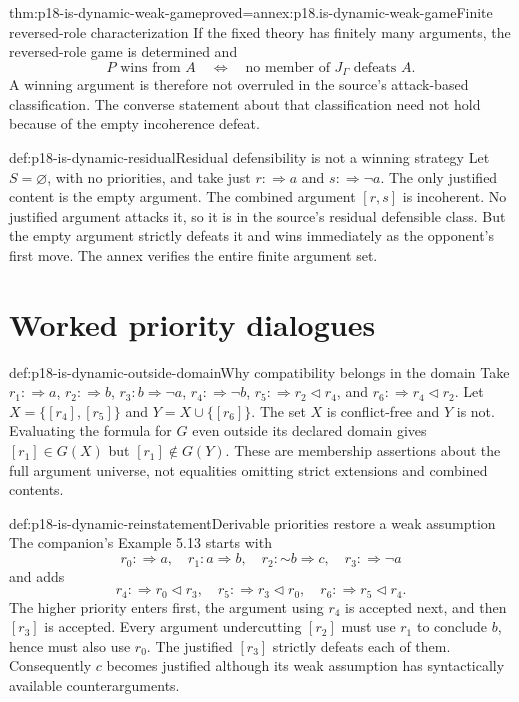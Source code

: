 \begin{hbtheorem}{thm:p18-is-dynamic-weak-game}{proved=annex:p18.is-dynamic-weak-game}{Finite reversed-role characterization}
If the fixed theory has finitely many arguments, the reversed-role
game is determined and
\[
 P\text{ wins from }A
 \quad\Longleftrightarrow\quad
 \text{no member of }J_\Gamma\text{ defeats }A.
\]
A winning argument is therefore not overruled in the source's
attack-based classification. The converse statement about that
classification need not hold because of the empty incoherence
defeat.
\end{hbtheorem}

\begin{hbexample}{def:p18-is-dynamic-residual}{Residual defensibility is not a winning strategy}
Let \(S=\varnothing\), with no priorities, and take just
\(r:\Rightarrow a\) and \(s:\Rightarrow\neg a\).
The only justified content is the empty argument.
The combined argument \([r,s]\) is incoherent. No justified argument
attacks it, so it is in the source's residual defensible class.
But the empty argument strictly defeats it and wins immediately
as the opponent's first move. The annex verifies the entire finite
argument set.
\end{hbexample}

\section{Worked priority dialogues}

\begin{hbexample}{def:p18-is-dynamic-outside-domain}{Why compatibility belongs in the domain}
Take \(r_1:\Rightarrow a\), \(r_2:\Rightarrow b\),
\(r_3:b\Rightarrow\neg a\), \(r_4:\Rightarrow\neg b\),
\(r_5:\Rightarrow r_2\triangleleft r_4\), and
\(r_6:\Rightarrow r_4\triangleleft r_2\).
Let \(X=\{[r_4],[r_5]\}\) and \(Y=X\cup\{[r_6]\}\).
The set \(X\) is conflict-free and \(Y\) is not.
Evaluating the formula for \(G\) even outside its declared domain
gives \([r_1]\in G(X)\) but \([r_1]\notin G(Y)\).
These are membership assertions about the full argument universe,
not equalities omitting strict extensions and combined contents.
\end{hbexample}

\begin{hbexample}{def:p18-is-dynamic-reinstatement}{Derivable priorities restore a weak assumption}
The companion's Example 5.13 starts with
\[
r_0:\Rightarrow a,\quad r_1:a\Rightarrow b,\quad
r_2:\mathord{\sim}b\Rightarrow c,\quad r_3:\Rightarrow\neg a
\]
and adds
\[
r_4:\Rightarrow r_0\triangleleft r_3,\quad
r_5:\Rightarrow r_3\triangleleft r_0,\quad
r_6:\Rightarrow r_5\triangleleft r_4.
\]
The higher priority enters first, the argument using \(r_4\)
is accepted next, and then \([r_3]\) is accepted.
Every argument undercutting \([r_2]\) must use \(r_1\) to conclude
\(b\), hence must also use \(r_0\).
The justified \([r_3]\) strictly defeats each of them.
Consequently \(c\) becomes justified although its weak assumption
has syntactically available counterarguments.
\end{hbexample}

